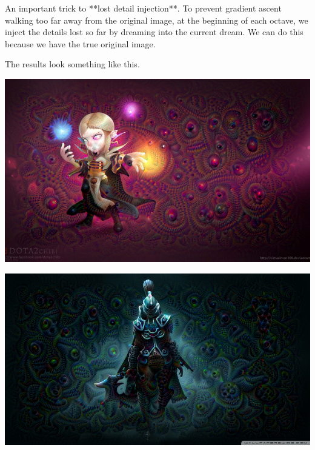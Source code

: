 \documentclass[graybox]{svmult}
\begin{document}
 An important trick to **lost detail injection**. To prevent gradient ascent walking too far away from the original image, at the beginning of each octave, we inject the details lost so far by dreaming into the current dream. We can do this because we have the true original image.

 The results look something like this. 

\includegraphics[width=\textwidth]{final_dream.png}

\includegraphics[width=\textwidth]{final_dream_pa.png}
\end{document}
